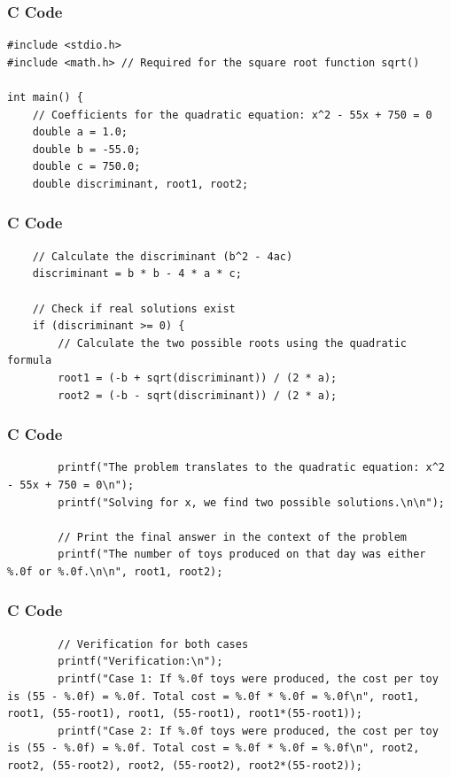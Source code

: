 \documentclass{beamer}
\begin{document}
\begin{frame}[fragile]
\frametitle{C Code}
\begin{lstlisting}
#include <stdio.h>
#include <math.h> // Required for the square root function sqrt()

int main() {
    // Coefficients for the quadratic equation: x^2 - 55x + 750 = 0
    double a = 1.0;
    double b = -55.0;
    double c = 750.0;
    double discriminant, root1, root2;
\end{lstlisting}
\end{frame}

\begin{frame}[fragile]
\frametitle{C Code}
\begin{lstlisting}
    // Calculate the discriminant (b^2 - 4ac)
    discriminant = b * b - 4 * a * c;

    // Check if real solutions exist
    if (discriminant >= 0) {
        // Calculate the two possible roots using the quadratic formula
        root1 = (-b + sqrt(discriminant)) / (2 * a);
        root2 = (-b - sqrt(discriminant)) / (2 * a);
\end{lstlisting}
\end{frame}

\begin{frame}[fragile]
\frametitle{C Code}
\begin{lstlisting}
        printf("The problem translates to the quadratic equation: x^2 - 55x + 750 = 0\n");
        printf("Solving for x, we find two possible solutions.\n\n");
        
        // Print the final answer in the context of the problem
        printf("The number of toys produced on that day was either %.0f or %.0f.\n\n", root1, root2);
\end{lstlisting}
\end{frame}

\begin{frame}[fragile]
\frametitle{C Code}
\begin{lstlisting}       
        // Verification for both cases
        printf("Verification:\n");
        printf("Case 1: If %.0f toys were produced, the cost per toy is (55 - %.0f) = %.0f. Total cost = %.0f * %.0f = %.0f\n", root1, root1, (55-root1), root1, (55-root1), root1*(55-root1));
        printf("Case 2: If %.0f toys were produced, the cost per toy is (55 - %.0f) = %.0f. Total cost = %.0f * %.0f = %.0f\n", root2, root2, (55-root2), root2, (55-root2), root2*(55-root2));
\end{lstlisting}
\end{frame}
\end{document}
